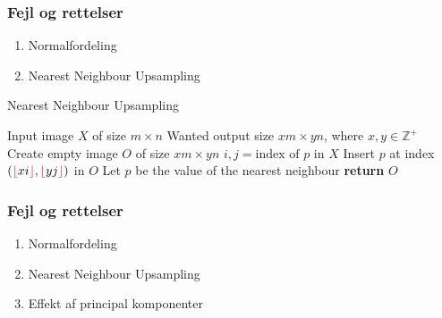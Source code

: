 \documentclass{beamer}
\begin{document}
\begin{frame}
    \frametitle{Fejl og rettelser}
    \begin{enumerate}
        \item Normalfordeling
        \item Nearest Neighbour Upsampling
    \end{enumerate}
    \begin{algorithm}[H]
        \caption{Nearest Neighbour Upsampling}
        \begin{algorithmic}[1]
            \Require Input image $X$ of size $m \times n$
            \Require Wanted output size $xm \times yn$, where $x, y \in \mathbb{Z}^{+}$
            \State Create empty image $O$ of size $xm \times yn$
                \State $i,j = \text{index of } p \text{ in } X$
                \State Insert $p$ at index $(\color{red}{\lfloor}\color{black}xi\color{red}{\rfloor}\color{black}, \color{red}{\lfloor}\color{black}yj\color{red}{\rfloor}\color{black})$ in $O$
            \EndFor
                \State Let $p$ be the value of the nearest neighbour
            \EndFor
            \State \textbf{return} $O$
        \end{algorithmic}
    \end{algorithm}
\end{frame}

\begin{frame}
    \frametitle{Fejl og rettelser}
    \begin{enumerate}
        \item Normalfordeling
        \item Nearest Neighbour Upsampling
        \item Effekt af principal komponenter
    \end{enumerate}
\end{frame}
\end{document}
